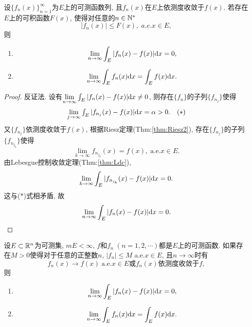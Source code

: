 \begin{theorem}[依测度收敛型Lebesgue控制收敛定理]
	设$\{ f_n(x) \}_{n=1}^{\infty}$为$E$上的可测函数列, 
	且$f_n(x)$在$E$上依测度收敛于$f(x)$. 
	若存在$E$上的可积函数$F(x)$, 使得对任意的$n \in \mathbb{N}^*$
	$$
		|f_n(x)| \leq F(x), \; a.e. x \in E ,
	$$
	则
	\begin{enumerate}
		\item 
		\begin{equation}
			\lim\limits_{n\to\infty}\int_E |f_n(x) - f(x)| \mathrm{d} x = 0,
		\end{equation}
		
		\item 
		\begin{equation}
			\lim\limits_{n\to\infty}\int_E f_n(x) \mathrm{d} x = \int_E f(x)\mathrm{d} x.
		\end{equation}
	\end{enumerate}
\end{theorem}
\begin{proof}
	反证法. 
	设有$\lim\limits_{n \to \infty}\int_E |f_n(x) - f(x)| \mathrm{d} x \neq 0$, 
	则存在$\{ f_n \}$的子列$\{ f_{n_j} \}$使得
	$$
	\begin{array}{c r}
		\lim\limits_{j\to\infty}\int_E |f_{n_j}(x) - f(x)| \mathrm{d} x = \alpha >0. 
		&  (*)
	\end{array}
	$$
	又$\{ f_{n_j} \}$依测度收敛于$f(x)$, 根据Riesz定理(Thm:\ref{thm:Riesz2}), 
	存在$\{ f_{n_j} \}$的子列$\{ f_{n_{j_k}} \}$使得
	$$
		\lim\limits_{k\to\infty}  f_{n_{j_k}}(x) = f(x),\;\text{a.e.} x\in E.
	$$
	由Lebesgue控制收敛定理(Thm:\ref{thm:Ldc}), 
	$$
		\lim\limits_{k\to\infty}\int_E |f_{n_{j_k}}(x) - f(x)| \mathrm{d} x = 0.
	$$
	这与($*$)式相矛盾, 故
	$$
		\lim\limits_{n\to\infty}\int_E |f_n(x) - f(x)| \mathrm{d} x = 0.
	$$
\end{proof}

\begin{corollary}
	设$E \subset \mathbb{R}^n$为可测集, $m E < \infty$, $f$和$f_n\;(n=1,2,\cdots)$都是$E$上的可测函数. 
	如果存在$M > 0$使得对于任意的正整数$n$, $| f_n | \leq M$ a.e.$x \in E$, 且$n \to \infty$时有
	$$
		f_n(x) \to f(x) \;\text{a.e.} x \in E
		\text{或}
		f_n(x) \text{依测度收敛于} f, 
	$$
	则
	\begin{enumerate}
		\item 
		\begin{equation}
			\lim\limits_{n\to\infty}\int_E |f_n(x) - f(x)| \mathrm{d} x = 0,
		\end{equation}
		
		\item 
		\begin{equation}
			\lim\limits_{n\to\infty}\int_E f_n(x) \mathrm{d} x = \int_E f(x)\mathrm{d} x.
		\end{equation}
	\end{enumerate}	
\end{corollary}

